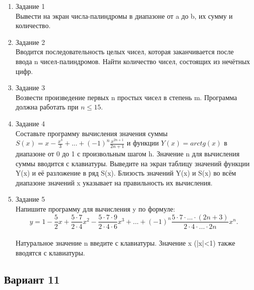 \documentclass[a4paper]{article}
\begin{document}
	
	\begin{enumerate} 
		\item Задание 1 \\
		Вывести на экран числа-палиндромы в диапазоне от a до b, их сумму и количество.\
		\item Задание 2\\
		Вводится последовательность целых чисел, которая заканчивается после ввода n чисел-палиндромов. Найти количество чисел, состоящих из нечётных цифр.\\
		\item Задание 3 \\
		Возвести произведение первых n простых чисел в степень m. Программа должна работать при $n \le 15$.\\
		\item Задание 4 \\ 
		Составьте программу вычисления значения суммы  $S(x)=x-\frac{x^3}{3}+...+(-1)^n\frac{x^{2n+1}}{2n+1}$
		и функции $Y(x)=arctg(x)$ в диапазоне от 0 до 1
		с произвольным шагом h. Значение n для вычисления суммы вводится с клавиатуры. Выведите на экран таблицу значений функции Y(x) и её разложение в ряд S(x). Близость значений Y(x) и S(x) во всём диапазоне
		значений x указывает на правильность их вычисления.\\
		\item Задание 5 \\
		Напишите программу для вычисления y по формуле:\\
		$$y=1-\frac{5}{2}x+\frac{5\cdot7}{2\cdot4}x^2-\frac{5\cdot7\cdot9}{2\cdot4\cdot6}x^3+...+(-1)^n\frac{5\cdot7\cdot...\cdot(2n+3)}{2\cdot4\cdot...\cdot2n}x^n.$$\\
		Натуральное значение n введите с клавиатуры. Значение x (|x|<1) также вводятся с клавиатуры.\\
	
	\end{enumerate}
\newpage
	\begin{center}
		\subsection*{Вариант 11}
	\end{center}
	
\end{document}
